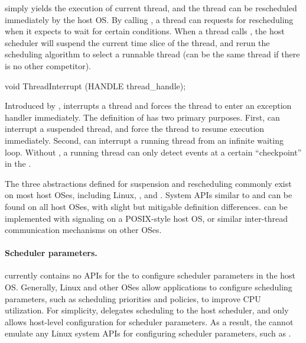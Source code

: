  simply yields the execution of current thread, and the thread can be rescheduled immediately by the host OS.
By calling , a thread can requests for rescheduling when it expects
to wait for certain conditions.
When a thread calls , the host scheduler will suspend the current time slice of the thread,
and rerun the scheduling algorithm
to select a runnable thread (can be the same thread if there is no other competitor).



\begin{paldef}
void ThreadInterrupt (HANDLE thread_handle);
\end{paldef}



Introduced by \graphene{},
 interrupts a thread and forces the thread to enter an exception handler immediately.
The definition of  has two primary purposes.
First,  can interrupt a suspended thread, and force the thread to resume execution immediately.
Second,  can interrupt a running thread from an infinite waiting loop.
Without ,
a running thread can only detect events at a certain ``checkpoint'' in the \libos{}.


The three abstractions defined for suspension and rescheduling
commonly exist on most host OSes, including Linux, \win{}, and \osx{}.
System APIs similar to
 and 
can be found on all host OSes,
with slight but mitigable definition differences.
 can be implemented with signaling on a POSIX-style host OS,
or similar inter-thread communication
mechanisms on other OSes.







\paragraph{Scheduler parameters.}
\Thehostabi{} currently contains no APIs for the \libos{} to configure scheduler parameters in the host OS.
Generally, Linux and other OSes allow applications to configure scheduling parameters,
such as scheduling priorities and policies,
to improve CPU utilization.
For simplicity,
\thehostabi{} delegates scheduling to the host scheduler,
and only allows host-level configuration for scheduler parameters.
As a result, the \libos{} cannot emulate any Linux system APIs for configuring scheduler parameters,
such as .



